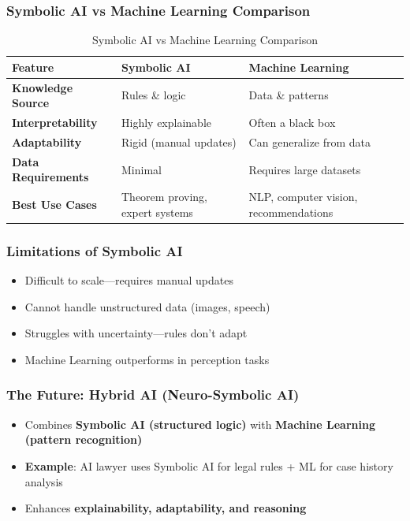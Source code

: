 \subsubsection{Symbolic AI vs Machine Learning Comparison}

\begin{table}[h!]
\centering
\begin{tabular}{|l|l|l|}
\hline
\textbf{Feature} & \textbf{Symbolic AI} & \textbf{Machine Learning} \\
\hline
\textbf{Knowledge Source} & Rules \& logic & Data \& patterns \\
\hline
\textbf{Interpretability} & Highly explainable & Often a black box \\
\hline
\textbf{Adaptability} & Rigid (manual updates) & Can generalize from data \\
\hline
\textbf{Data Requirements} & Minimal & Requires large datasets \\
\hline
\textbf{Best Use Cases} & Theorem proving, expert systems & NLP, computer vision, recommendations \\
\hline
\end{tabular}
\caption{Symbolic AI vs Machine Learning Comparison}
\end{table}

\subsubsection{Limitations of Symbolic AI}

\begin{itemize}
\item Difficult to scale—requires manual updates
\item Cannot handle unstructured data (images, speech)
\item Struggles with uncertainty—rules don't adapt
\item Machine Learning outperforms in perception tasks
\end{itemize}

\subsubsection{The Future: Hybrid AI (Neuro-Symbolic AI)}

\begin{itemize}
\item Combines \textbf{Symbolic AI (structured logic)} with \textbf{Machine Learning (pattern recognition)}
\item \textbf{Example}: AI lawyer uses Symbolic AI for legal rules + ML for case history analysis
\item Enhances \textbf{explainability, adaptability, and reasoning}
\end{itemize}


